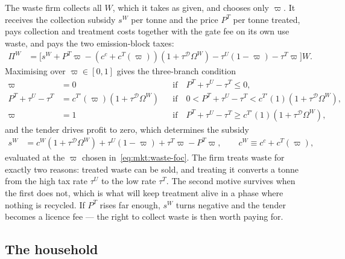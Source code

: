  The waste firm collects all $W$, which it takes as given, and chooses
only $\varpi$. It receives the collection subsidy $s^W$ per tonne and the price $P^T$ per tonne
treated, pays collection and treatment costs together with the gate fee on its own use waste, and pays
the two emission-block taxes:
\begin{align}
\Pi^W &= \Big[s^W+P^T\varpi
-\left(c^c+c^T\!\left(\varpi\right)\right)\left(1+\tau^{\mathcal D}\Omega^W\right)
-\tau^U\left(1-\varpi\right)-\tau^T\varpi\Big]W .
\label{eq:mkt:waste-profit}
\end{align}
Maximising over $\varpi\in\left[0,1\right]$ gives the three-branch condition
\begin{subequations}
\label{eq:mkt:waste-foc}
\begin{align}
\varpi &= 0
&&\text{if}\quad P^T+\tau^U-\tau^T\le0,
\\
P^T+\tau^U-\tau^T &= c^{T\prime}\!\left(\varpi\right)\left(1+\tau^{\mathcal D}\Omega^W\right)
&&\text{if}\quad 0<P^T+\tau^U-\tau^T<c^{T\prime}\!\left(1\right)\left(1+\tau^{\mathcal D}\Omega^W\right),
\\
\varpi &= 1
&&\text{if}\quad P^T+\tau^U-\tau^T\ge c^{T\prime}\!\left(1\right)\left(1+\tau^{\mathcal D}\Omega^W\right),
\end{align}
\end{subequations}
and the tender drives profit to zero, which determines the subsidy
\begin{align}
s^W &= c^W\left(1+\tau^{\mathcal D}\Omega^W\right)+\tau^U\left(1-\varpi\right)+\tau^T\varpi-P^T\varpi,
\qquad c^W\equiv c^c+c^T\!\left(\varpi\right),
\label{eq:mkt:waste-zero-profit}
\end{align}
evaluated at the $\varpi$ chosen in~\eqref{eq:mkt:waste-foc}. The firm treats waste for exactly two
reasons: treated waste can be sold, and treating it converts a tonne from the high tax rate $\tau^U$ to
the low rate $\tau^T$. The second motive survives when the first does not, which is what will keep
treatment alive in a phase where nothing is recycled. If $P^T$ rises far enough, $s^W$ turns negative
and the tender becomes a licence fee --- the right to collect waste is then worth paying for.

\subsection{The household}\label{sec:mkt:setup:household}

